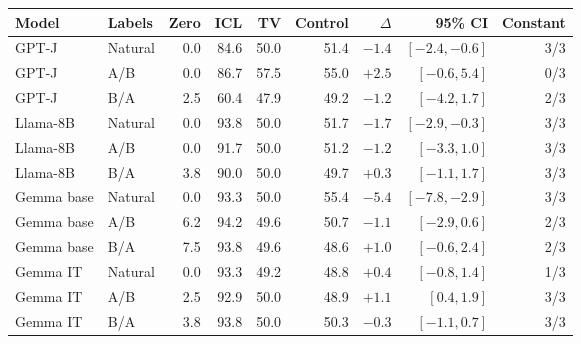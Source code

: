 \begin{tabular}{llrrrrrrr}
\toprule
Model & Labels & Zero & ICL & TV & Control & $\Delta$ & 95\% CI & Constant \\
\midrule
GPT-J & Natural & 0.0 & 84.6 & 50.0 & 51.4 & $-1.4$ & $[-2.4,-0.6]$ & 3/3 \\
GPT-J & A/B & 0.0 & 86.7 & 57.5 & 55.0 & $+2.5$ & $[-0.6,5.4]$ & 0/3 \\
GPT-J & B/A & 2.5 & 60.4 & 47.9 & 49.2 & $-1.2$ & $[-4.2,1.7]$ & 2/3 \\
Llama-8B & Natural & 0.0 & 93.8 & 50.0 & 51.7 & $-1.7$ & $[-2.9,-0.3]$ & 3/3 \\
Llama-8B & A/B & 0.0 & 91.7 & 50.0 & 51.2 & $-1.2$ & $[-3.3,1.0]$ & 3/3 \\
Llama-8B & B/A & 3.8 & 90.0 & 50.0 & 49.7 & $+0.3$ & $[-1.1,1.7]$ & 3/3 \\
Gemma base & Natural & 0.0 & 93.3 & 50.0 & 55.4 & $-5.4$ & $[-7.8,-2.9]$ & 3/3 \\
Gemma base & A/B & 6.2 & 94.2 & 49.6 & 50.7 & $-1.1$ & $[-2.9,0.6]$ & 2/3 \\
Gemma base & B/A & 7.5 & 93.8 & 49.6 & 48.6 & $+1.0$ & $[-0.6,2.4]$ & 2/3 \\
Gemma IT & Natural & 0.0 & 93.3 & 49.2 & 48.8 & $+0.4$ & $[-0.8,1.4]$ & 1/3 \\
Gemma IT & A/B & 2.5 & 92.9 & 50.0 & 48.9 & $+1.1$ & $[0.4,1.9]$ & 3/3 \\
Gemma IT & B/A & 3.8 & 93.8 & 50.0 & 50.3 & $-0.3$ & $[-1.1,0.7]$ & 3/3 \\
\bottomrule
\end{tabular}
